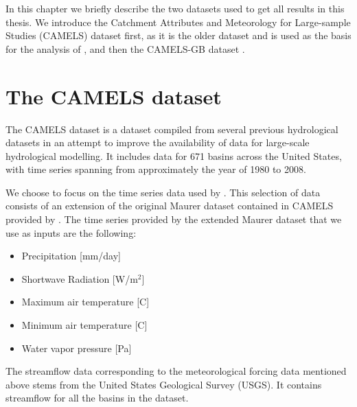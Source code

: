 In this chapter we briefly describe the two datasets used to get all results in 
this thesis. We introduce the Catchment Attributes and Meteorology for Large-sample Studies 
(CAMELS) dataset \citep{CAMELS_US} first, as it is the 
older dataset and is used as the basis for the analysis of 
\citet{lstm_first_paper, lstm_second_paper, lstm_third_paper}, and then the CAMELS-GB 
dataset \cite{CAMELS_GB}.
\section{The CAMELS dataset}
The CAMELS dataset \citep{CAMELS_US}
is a dataset compiled from several previous hydrological datasets in an attempt to 
improve the availability of data for large-scale hydrological modelling. It includes 
data for 671 basins across the United States, with time series spanning from 
approximately the year of 1980 to 2008.

We choose to focus on the time series data 
used by \citet{lstm_second_paper}. This selection of data consists of an extension 
of the original Maurer dataset contained in CAMELS provided by \citet{maurer_hydroshare}.
The time series provided by the extended Maurer dataset that we use as inputs are 
the following:
\begin{itemize}
    \item Precipitation [mm/day]
    \item Shortwave Radiation [W/m$^2$]
    \item Maximum air temperature [C\degree]
    \item Minimum air temperature [C\degree]
    \item Water vapor pressure [Pa]
\end{itemize}
The streamflow data corresponding to the meteorological forcing data mentioned above 
stems from the United States Geological Survey (USGS). It contains streamflow for 
all the basins in the dataset.

